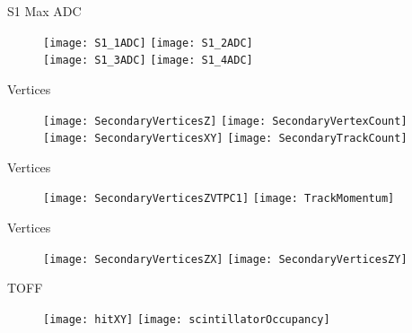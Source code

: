 \documentclass[11pt]{beamer}
\begin{document}
\begin{frame}{S1 Max ADC}
\begin{figure}
\centering
\texttt{[image: S1\_1ADC]}
\texttt{[image: S1\_2ADC]} \\
\texttt{[image: S1\_3ADC]}
\texttt{[image: S1\_4ADC]}
\end{figure}
\end{frame}

\begin{frame}{Vertices}
\begin{figure}
\centering
\texttt{[image: SecondaryVerticesZ]}
\texttt{[image: SecondaryVertexCount]} \\
\texttt{[image: SecondaryVerticesXY]}
\texttt{[image: SecondaryTrackCount]} \\
\end{figure}
\end{frame}

\begin{frame}{Vertices}
\begin{figure}
\centering
\texttt{[image: SecondaryVerticesZVTPC1]}
\texttt{[image: TrackMomentum]}
\end{figure}
\end{frame}

\begin{frame}{Vertices}
\begin{figure}
\centering
\texttt{[image: SecondaryVerticesZX]}
\texttt{[image: SecondaryVerticesZY]}
\end{figure}
\end{frame}

\begin{frame}{TOFF}
\begin{figure}
\centering
\texttt{[image: hitXY]}
\texttt{[image: scintillatorOccupancy]}
\end{figure}
\end{frame}
\end{document}
